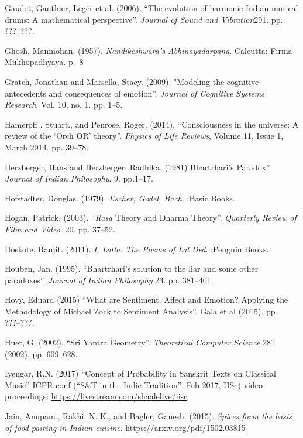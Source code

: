 \begin{thebibliography}{99}
Gaudet, Gauthier, Leger et al. (2006). “The evolution of harmonic Indian musical drums: A mathematical perspective”. \textsl{Journal of Sound and Vibration}291. pp. ???--???.

Ghosh, Manmohan. (1957). \textsl{Nandikeshwara’s Abhinayadarpana}. Calcutta: Firma Mukhopadhyaya. p.~8

Gratch, Jonathan and Marsella, Stacy. (2009). "Modeling the cognitive antecedents and consequences of emotion”. \textsl{Journal of Cognitive Systems Research}, Vol. 10, no. 1. pp. 1--5.

Hameroff . Stuart., and Penrose, Roger. (2014). “Consciousness in the universe: A review of the ‘Orch OR’ theory”. \textsl{Physics of Life Reviews}, Volume 11, Issue 1, March 2014. pp. 39--78.

Herzberger, Hans and Herzberger, Radhika. (1981) Bhartrhari’s Paradox”. \textsl{Journal of Indian Philosophy}. 9. pp.1--17.

Hofstadter, Douglas. (1979). \textsl{Escher, Godel, Bach}. :Basic Books.

Hogan, Patrick. (2003). “\textsl{Rasa} Theory and Dharma Theory”. \textsl{Quarterly Review of Film and Video}. 20. pp. 37--52.

Hoskote, Ranjit. (2011). \textsl{I, Lalla: The Poems of Lal Ded}. :Penguin Books.

Houben, Jan. (1995). “Bhartrhari’s solution to the liar and some other paradoxes”. \textsl{Journal of Indian Philosophy} 23. pp. 381--401.

Hovy, Eduard (2015) “What are Sentiment, Affect and Emotion? Applying the Methodology of Michael Zock to Sentiment Analysis”. Gala et al (2015). pp. ???--???.

Huet, G. (2002). “Sri Yantra Geometry”. \textsl{Theoretical Computer Science} 281 (2002). pp. 609--628.

Iyengar, R.N. (2017) “Concept of Probability in Sanskrit Texts on Classical Music” ICPR conf (“S\&T in the Indic Tradition”, Feb 2017, IISc) video proceedings: \url{https://livestream.com/shaalelive/iisc}

Jain, Anupam., Rakhi, N. K., and Bagler, Ganesh. (2015). \textsl{Spices form the basis of food pairing in Indian cuisine}. \url{https://arxiv.org/pdf/1502.03815}


\end{thebibliography}
